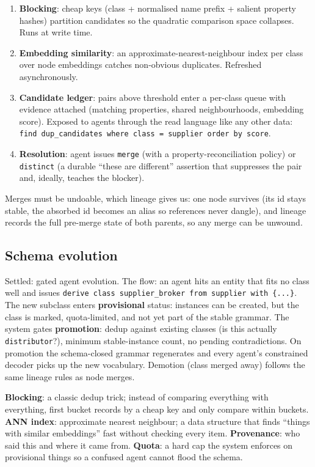 \documentclass[11pt]{article}
\begin{document}
\begin{enumerate}[leftmargin=1.4em,itemsep=2pt]
  \item \textbf{Blocking}: cheap keys (class + normalised name prefix + salient property hashes) partition candidates so the quadratic comparison space collapses. Runs at write time.
  \item \textbf{Embedding similarity}: an approximate-nearest-neighbour index per class over node embeddings catches non-obvious duplicates. Refreshed asynchronously.
  \item \textbf{Candidate ledger}: pairs above threshold enter a per-class queue with evidence attached (matching properties, shared neighbourhoods, embedding score). Exposed to agents through the read language like any other data: \texttt{find dup\_candidates where class = supplier order by score}.
  \item \textbf{Resolution}: agent issues \texttt{merge} (with a property-reconciliation policy) or \texttt{distinct} (a durable ``these are different'' assertion that suppresses the pair and, ideally, teaches the blocker).
\end{enumerate}

Merges must be undoable, which lineage gives us: one node survives (its id stays stable, the absorbed id becomes an alias so references never dangle), and lineage records the full pre-merge state of both parents, so any merge can be unwound.

\subsection{Schema evolution}

Settled: gated agent evolution. The flow: an agent hits an entity that fits no class well and issues \texttt{derive class supplier\_broker from supplier with \{...\}}. The new subclass enters \textbf{provisional} status: instances can be created, but the class is marked, quota-limited, and not yet part of the stable grammar. The system gates \textbf{promotion}: dedup against existing classes (is this actually \texttt{distributor}?), minimum stable-instance count, no pending contradictions. On promotion the schema-closed grammar regenerates and every agent's constrained decoder picks up the new vocabulary. Demotion (class merged away) follows the same lineage rules as node merges.

\begin{glossbox}
\textbf{Blocking}: a classic dedup trick; instead of comparing everything with everything, first bucket records by a cheap key and only compare within buckets. \textbf{ANN index}: approximate nearest neighbour; a data structure that finds ``things with similar embeddings'' fast without checking every item. \textbf{Provenance}: who said this and where it came from. \textbf{Quota}: a hard cap the system enforces on provisional things so a confused agent cannot flood the schema.
\end{glossbox}
\end{document}
